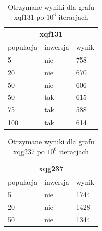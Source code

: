 \documentclass[11pt]{article}
\begin{document}
\begin{table}[]
    \centering
    \begin{tabular}{|lll|}
    \hline
    \multicolumn{3}{|c|}{xqf131}                                            \\ \hline
    \multicolumn{1}{|l|}{populacja} & \multicolumn{1}{l|}{inwersja} & wynik \\ \hline
    \multicolumn{1}{|l|}{5}         & \multicolumn{1}{l|}{nie}      & 758   \\ \hline
    \multicolumn{1}{|l|}{20}        & \multicolumn{1}{l|}{nie}      & 670   \\ \hline
    \multicolumn{1}{|l|}{50}        & \multicolumn{1}{l|}{nie}      & 606   \\ \hline
    \multicolumn{1}{|l|}{50}        & \multicolumn{1}{l|}{tak}      & 615   \\ \hline
    \multicolumn{1}{|l|}{75}        & \multicolumn{1}{l|}{tak}      & 588   \\ \hline
    \multicolumn{1}{|l|}{100}       & \multicolumn{1}{l|}{tak}      & 614   \\ \hline
    \end{tabular}
    \caption{Otrzymane wyniki dla grafu xqf131 po $10^{6}$ iteracjach}
    \label{tab1}
\end{table}
\begin{table}[]
    \centering
    \begin{tabular}{|lll|}
    \hline
    \multicolumn{3}{|c|}{xqg237}                                            \\ \hline
    \multicolumn{1}{|l|}{populacja} & \multicolumn{1}{l|}{inwersja} & wynik \\ \hline
    \multicolumn{1}{|l|}{5}         & \multicolumn{1}{l|}{nie}      & 1744  \\ \hline
    \multicolumn{1}{|l|}{20}        & \multicolumn{1}{l|}{nie}      & 1428  \\ \hline
    \multicolumn{1}{|l|}{50}        & \multicolumn{1}{l|}{nie}      & 1344  \\ \hline
    \end{tabular}
    \caption{Otrzymane wyniki dla grafu xqg237 po $10^{6}$ iteracjach}
    \label{tab2}
\end{table}
\end{document}
